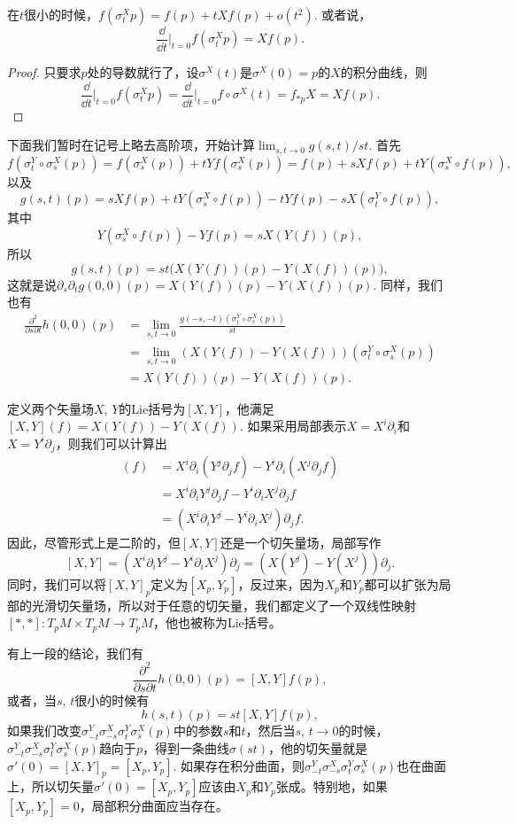 \begin{lem}
在$t$很小的时候，$f(\sigma_t^X p)=f(p)+tXf(p)+o(t^2)$. 或者说，
\[
	\frac{\dd}{\dd t}\biggr|_{t=0}f(\sigma_t^X p)=Xf(p).
\]
\end{lem}

\begin{proof}
只要求$p$处的导数就行了，设$\sigma^X(t)$是$\sigma^X(0)=p$的$X$的积分曲线，则
\[
	\frac{\dd}{\dd t}\biggr|_{t=0}f(\sigma_t^X p)=\frac{\dd}{\dd t}\biggr|_{t=0}f\circ \sigma^X (t)=f_{* p}X=Xf(p).
\]
\end{proof}

下面我们暂时在记号上略去高阶项，开始计算$\lim_{s,t\to 0}g(s,t)/st$. 首先
\[
	f(\sigma^Y_t\circ\sigma^X_s(p))=f(\sigma^X_s(p))+tYf(\sigma^X_s(p))=f(p)+sXf(p)+tY(\sigma^X_s\circ f(p)),
\]
以及
\[
	g(s,t)(p)=sXf(p)+tY(\sigma^X_s\circ f(p))-tYf(p)-sX(\sigma^Y_t\circ f(p)),
\]
其中
\[
	Y(\sigma^X_s\circ f(p))-Yf(p)=sX(Y(f))(p),
\]
所以
\[
	g(s,t)(p)=st\bigl(X(Y(f))(p)-Y(X(f))(p)\bigr),
\]
这就是说$\partial_s\partial_t g(0,0)(p)=X(Y(f))(p)-Y(X(f))(p)$. 同样，我们也有
\[
\begin{aligned}
	\frac{\partial^2}{\partial s\partial t} h(0,0)(p)&=\lim_{s,t\to 0}\frac{g(-s,-t)\left(\sigma^Y_t\circ\sigma^X_s(p)\right)}{st}\\
	&=\lim_{s,t\to 0}\left(X(Y(f))-Y(X(f))\right)\left(\sigma^Y_t\circ\sigma^X_s(p)\right)\\
	&=X(Y(f))(p)-Y(X(f))(p).
\end{aligned}
\]

\begin{para}[Lie括号]
定义两个矢量场$X$, $Y$的Lie括号为$[X,Y]$，他满足$[X,Y](f)=X(Y(f))-Y(X(f))$. 如果采用局部表示$X=X^i\partial_i$和$X=Y^i\partial_j$，则我们可以计算出
\begin{align*}
	[X,Y](f)&=X^i\partial_i(Y^j\partial_j f)-Y^i\partial_i(X^j\partial_j f)\\
	&=X^i\partial_iY^j\partial_j f-Y^i\partial_i X^j\partial_j f\\
	&=(X^i\partial_iY^j-Y^i\partial_i X^j)\partial_jf.
\end{align*}
因此，尽管形式上是二阶的，但$[X,Y]$还是一个切矢量场，局部写作
\[
[X,Y]=(X^i\partial_iY^j-Y^i\partial_i X^j)\partial_j=(X(Y^j)-Y(X^j))\partial_j.
\]
同时，我们可以将$[X,Y]_p$定义为$[X_p,Y_p]$，反过来，因为$X_p$和$Y_p$都可以扩张为局部的光滑切矢量场，所以对于任意的切矢量，我们都定义了一个双线性映射$[*,*]:T_pM\times T_pM\to T_pM$，他也被称为Lie括号。
\end{para} 

有上一段的结论，我们有
\[
	\frac{\partial^2}{\partial s\partial t} h(0,0)(p)=[X,Y]f(p),
\]
或者，当$s$, $t$很小的时候有
\[
	h(s,t)(p)=st[X,Y]f(p),
\]
如果我们改变$\sigma^Y_{-t}\sigma^X_{-s}\sigma^Y_{t}\sigma^X_{s}(p)$中的参数$s$和$t$，然后当$s$, $t\to 0$的时候，$\sigma^Y_{-t}\sigma^X_{-s}\sigma^Y_{t}\sigma^X_{s}(p)$趋向于$p$，得到一条曲线$\sigma(st)$，他的切矢量就是$\sigma'(0)=[X,Y]_p=[X_p,Y_p]$. 如果存在积分曲面，则$\sigma^Y_{-t}\sigma^X_{-s}\sigma^Y_{t}\sigma^X_{s}(p)$也在曲面上，所以切矢量$\sigma'(0)=[X_p,Y_p]$应该由$X_p$和$Y_p$张成。特别地，如果$[X_p,Y_p]=0$，局部积分曲面应当存在。


